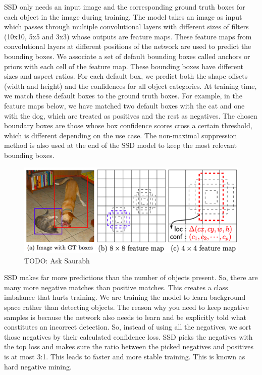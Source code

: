 \documentclass[12pt,letterpaper]{article}
\begin{document}
SSD only needs an input image and the corresponding ground truth boxes for each object in the image during training. The model takes an image as input which passes through multiple convolutional layers with different sizes of filters (10x10, 5x5 and 3x3) whose outputs are feature maps. These feature maps from convolutional layers at different positions of the network are used to predict the bounding boxes. We associate a set of default bounding boxes called anchors or priors with each cell of the feature map. These bounding boxes have different sizes and aspect ratios. For each default box, we predict both the shape offsets (width and height) and the confidences for all object categories. At training time, we match these default boxes to the ground truth boxes. For example, in the feature maps below, we have matched two default boxes with the cat and one with the dog, which are treated as positives and the rest as negatives. The chosen boundary boxes are those whose box confidence scores cross a certain threshold, which is different depending on the use case. The non-maximal suppression method is also used at the end of the SSD model to keep the most relevant bounding boxes.

\begin{figure}[h!]
    \centering
\includegraphics[width = \textwidth,keepaspectratio]{assets/SSDpic.png}
\caption{TODO: Ask Saurabh}
\end{figure}

SSD makes far more predictions than the number of objects present. So, there are many more negative matches than positive matches. This creates a class imbalance that hurts training. We are training the model to learn background space rather than detecting objects. The reason why you need to keep negative samples is because the network also needs to learn and be explicitly told what constitutes an incorrect detection. So, instead of using all the negatives, we sort those negatives by their calculated confidence loss. SSD picks the negatives with the top loss and makes sure the ratio between the picked negatives and positives is at most 3:1. This leads to faster and more stable training. This is known as hard negative mining.
\end{document}
